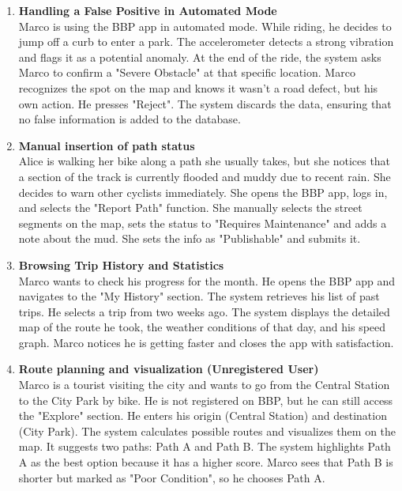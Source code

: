 \begin{enumerate}
    \item \textbf{Handling a False Positive in Automated Mode} \\
    Marco is using the BBP app in automated mode. While riding, he decides to jump off a curb to enter a park. The accelerometer detects a strong vibration and flags it as a potential anomaly. At the end of the ride, the system asks Marco to confirm a "Severe Obstacle" at that specific location. Marco recognizes the spot on the map and knows it wasn't a road defect, but his own action. He presses "Reject". The system discards the data, ensuring that no false information is added to the database.

    \item \textbf{Manual insertion of path status} \\
    Alice is walking her bike along a path she usually takes, but she notices that a section of the track is currently flooded and muddy due to recent rain. She decides to warn other cyclists immediately. She opens the BBP app, logs in, and selects the "Report Path" function. She manually selects the street segments on the map, sets the status to "Requires Maintenance" and adds a note about the mud. She sets the info as "Publishable" and submits it.

    \item \textbf{Browsing Trip History and Statistics} \\
    Marco wants to check his progress for the month. He opens the BBP app and navigates to the "My History" section. The system retrieves his list of past trips. He selects a trip from two weeks ago. The system displays the detailed map of the route he took, the weather conditions of that day, and his speed graph. Marco notices he is getting faster and closes the app with satisfaction.

    \item \textbf{Route planning and visualization (Unregistered User)} \\
    Marco is a tourist visiting the city and wants to go from the Central Station to the City Park by bike. He is not registered on BBP, but he can still access the "Explore" section. He enters his origin (Central Station) and destination (City Park). The system calculates possible routes and visualizes them on the map. It suggests two paths: Path A and Path B. The system highlights Path A as the best option because it has a higher score. Marco sees that Path B is shorter but marked as "Poor Condition", so he chooses Path A.


\end{enumerate}
